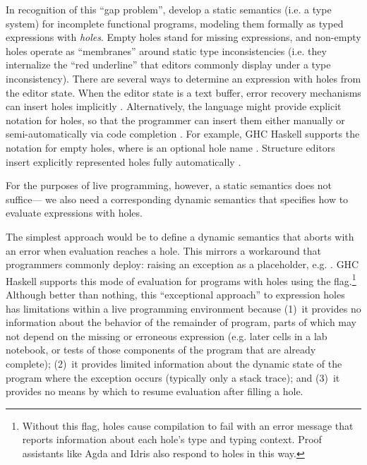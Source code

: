 In recognition of this ``{gap problem}'', \citet{popl-paper} develop a static semantics (i.e. a type system) for incomplete 
functional programs, modeling them formally as typed expressions with \emph{holes}. 
Empty holes stand for missing expressions,
and non-empty holes operate as ``membranes'' around static type inconsistencies 
(i.e. they internalize the ``red underline'' that editors commonly display under a type inconsistency).
There are several ways to determine an expression with holes from the editor state. When the editor state is a text buffer, error recovery mechanisms can insert holes implicitly \cite{DBLP:journals/siamcomp/AhoP72,charles1991practical,DBLP:conf/oopsla/KatsJNV09}. 
Alternatively, the language might provide explicit notation for holes, so that the programmer can insert them either manually  
or semi-automatically via code completion \cite{Amorim2016}. For example, GHC Haskell supports the notation  for empty holes, where  is an optional hole name \cite{GHCHoles}. Structure editors insert explicitly represented holes fully automatically \cite{popl-paper}.

%
For the purposes of live programming, however, a static semantics does not suffice---%
we also need a corresponding dynamic semantics that specifies how to evaluate expressions with holes. %
%

The simplest approach would be to define a dynamic semantics that aborts with an error when evaluation reaches a hole. 
%
This mirrors a workaround that programmers commonly deploy: 
raising an exception as a placeholder, e.g. . 
GHC Haskell supports this mode of evaluation for programs with holes using the  flag.\footnote{
Without this flag, holes cause compilation to fail with an error message that reports information about each hole's type and typing context. 
Proof assistants like Agda \cite{norell:thesis,norell2009dependently} and Idris \cite{brady2013idris} also respond to holes in this way.
} 
Although better than nothing, this ``exceptional approach'' to expression holes has limitations 
within a live programming environment because 
(1)~it provides no information about the behavior of the remainder of program, 
parts of which may not depend on the missing or erroneous expression (e.g. later cells in a lab notebook, or tests of those components of the program that are already complete); 
(2)~it provides limited information about the dynamic state of the program where the exception occurs
(typically only a stack trace);  
and 
(3)~it provides no means by which to resume evaluation after filling a hole.

